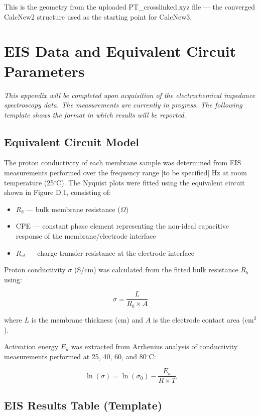 \documentclass[12pt,a4paper]{report}
\begin{document}
This is the geometry from the uploaded PT\_crosslinked.xyz file — the converged CalcNew2 structure used as the starting point for CalcNew3.

\chapter{EIS Data and Equivalent Circuit Parameters}

\textit{This appendix will be completed upon acquisition of the electrochemical impedance spectroscopy data. The measurements are currently in progress. The following template shows the format in which results will be reported.}

\section{Equivalent Circuit Model}

The proton conductivity of each membrane sample was determined from EIS measurements performed over the frequency range [to be specified] Hz at room temperature (25\(^\circ\)C). The Nyquist plots were fitted using the equivalent circuit shown in Figure D.1, consisting of:

\begin{itemize}
    \item \(R_b\) — bulk membrane resistance (\(\Omega\))
    \item CPE — constant phase element representing the non-ideal capacitive response of the membrane/electrode interface
    \item \(R_{ct}\) — charge transfer resistance at the electrode interface
\end{itemize}

Proton conductivity \(\sigma\) (S/cm) was calculated from the fitted bulk resistance \(R_b\) using:

\[
\sigma = \frac{L}{R_b \times A}
\]

where \(L\) is the membrane thickness (cm) and \(A\) is the electrode contact area (cm\(^2\)).

Activation energy \(E_a\) was extracted from Arrhenius analysis of conductivity measurements performed at 25, 40, 60, and 80\(^\circ\)C:

\[
\ln(\sigma) = \ln(\sigma_0) - \frac{E_a}{R \times T}
\]

\section{EIS Results Table (Template)}
\end{document}
